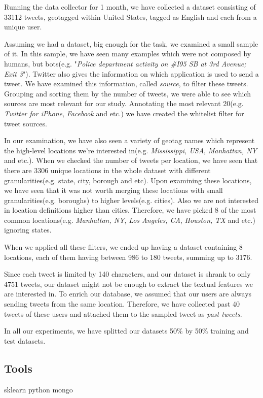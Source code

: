 \documentclass[twoside,11pt]{article}
\begin{document}
Running the data collector for 1 month, we have collected a dataset consisting of 33112 tweets, geotagged within United States, tagged as English and each from a unique user.

Assuming we had a dataset, big enough for the task, we examined a small sample of it. In this sample, we have seen many examples which were not composed by humans, but bots(e.g. "\textit{Police department activity on \#I95 SB at 3rd Avenue; Exit 3}"). Twitter also gives the information on which application is used to send a tweet. We have examined this information, called \textit{source}, to filter these tweets. Grouping and sorting them by the number of tweets, we were able to see which sources are most relevant for our study. Annotating the most relevant 20(e.g. \textit{Twitter for iPhone}, \textit{Facebook} and etc.) we have created the whitelist filter for tweet sources.

In our examination, we have also seen a variety of geotag names which represent the high-level locations we're interested in(e.g. \textit{Mississippi, USA}, \textit{Manhattan, NY} and etc.). When we checked the number of tweets per location, we have seen that there are 3306 unique locations in the whole dataset with different granularities(e.g. state, city, borough and etc). Upon examining these locations, we have seen that it was not worth merging these locations with small granularities(e.g. boroughs) to higher levels(e.g. cities). Also we are not interested in location definitions higher than cities. Therefore, we have picked 8 of the most common locations(e.g. \textit{Manhattan, NY}, \textit{Los Angeles, CA}, \textit{Houston, TX} and etc.) ignoring states. 

When we applied all these filters, we ended up having a dataset containing 8 locations, each of them having between 986 to 180 tweets, summing up to 3176.

Since each tweet is limited by 140 characters, and our dataset is shrank to only 4751 tweets, our dataset might not be enough to extract the textual features we are interested in. To enrich our database, we assumed that our users are always sending tweets from the same location. Therefore, we have collected past 40 tweets of these users and attached them to the sampled tweet as \textit{past tweets}.

In all our experiments, we have splitted our datasets 50\% by 50\% training and test datasets.
\subsection{Tools}
sklearn python mongo
\end{document}
